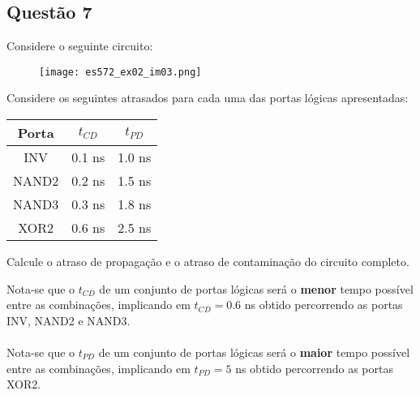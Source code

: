 \documentclass{article}
\begin{document}
        \subsection{Questão 7}
            \begin{exercise}
                Considere o seguinte circuito:
                    \begin{figure}[H]
                        \centering
                        \texttt{[image: es572\_ex02\_im03.png]}
                    \end{figure} \noindent
                Considere os seguintes atrasados para cada uma das portas lógicas apresentadas:
                    \begin{table}[H]
                        \centering  
                        \begin{tabular}[]{c|cc}\hline
                            Porta & $t_{CD}$ & $t_{PD}$\\\hline
                            INV   & 0.1 ns   & 1.0 ns\\
                            NAND2 & 0.2 ns   & 1.5 ns\\
                            NAND3 & 0.3 ns   & 1.8 ns\\
                            XOR2  & 0.6 ns   & 2.5 ns\\\hline
                        \end{tabular}
                    \end{table}
                Calcule o atraso de propagação e o atraso de contaminação do circuito completo.
            \end{exercise}
            \begin{resolution}
                Nota-se que o $t_{CD}$ de um conjunto de portas lógicas  será o \textbf{menor} tempo possível entre as combinações, implicando em $t_{CD} = 0.6$ ns obtido percorrendo as portas INV, NAND2 e NAND3.
                \\\\
                Nota-se que o $t_{PD}$ de um conjunto de portas lógicas será o \textbf{maior} tempo possível entre as combinações, implicando em $t_{PD} = 5$ ns obtido percorrendo as portas XOR2.
            \end{resolution}
\end{document}

